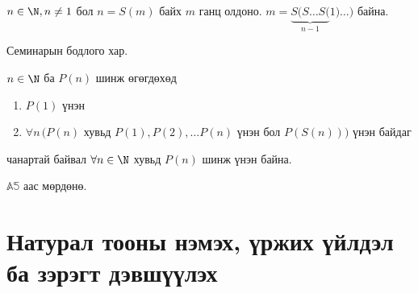 \begin{theorem}
   $n\in\N , n\neq 1$ бол $n=S(m)$ байх $m$ ганц олдоно. $m=\underbrace{S(S\ldots S(}_{n-1}1)\ldots)$ байна.
\end{theorem}
\begin{prof}
     Семинарын бодлого хар.
\end{prof}
\begin{theorem}\label{mathind}
$n\in\N$ ба $P(n)$ шинж өгөгдөхөд 
\begin{enumerate}
    \item $P(1)$ үнэн
    \item $\forall n\,(P(n)$ хувьд $P(1), P(2), \ldots P(n)$ үнэн бол $P(S(n)))$ үнэн байдаг
\end{enumerate} чанартай байвал $\forall n\in\N$ хувьд $P(n)$ шинж үнэн байна.
\end{theorem}
\begin{prof}
    $\mathbb{A5}$ аас мөрдөнө.
\end{prof}
\section{Натурал тооны нэмэх, үржих үйлдэл ба зэрэгт дэвшүүлэх}
